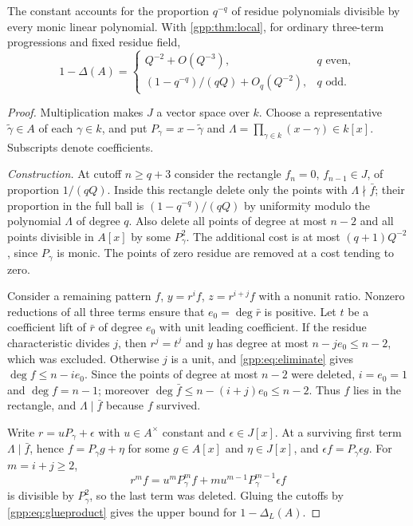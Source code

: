 The constant accounts for the proportion $q^{-q}$ of residue polynomials divisible by
every monic linear polynomial. With \cref{gpp:thm:local}, for ordinary three-term
progressions and fixed residue field,
\[
 1-\Delta(A)=\begin{cases}Q^{-2}+O(Q^{-3}),&q\text{ even},\\
 (1-q^{-q})/(qQ)+O_q(Q^{-2}),&q\text{ odd}.\end{cases}
\]

\begin{proof}
Multiplication makes $J$ a vector space over $k$. Choose a representative
$\tilde\gamma\in A$ of each $\gamma\in k$, and put $P_\gamma=x-\tilde\gamma$ and
$\Lambda=\prod_{\gamma\in k}(x-\gamma)\in k[x]$. Subscripts denote coefficients.

\emph{Construction.} At cutoff $n\ge q+3$ consider the rectangle $f_n=0$, $f_{n-1}\in J$,
of proportion $1/(qQ)$. Inside this rectangle delete only the points with
$\Lambda\nmid\bar f$; their proportion in the full ball is $(1-q^{-q})/(qQ)$ by
uniformity modulo the polynomial $\Lambda$ of degree $q$. Also delete all points of
degree at most $n-2$ and all points divisible in $A[x]$ by some $P_\gamma^2$. The
additional cost is at most $(q+1)Q^{-2}$, since $P_\gamma$ is monic. The points of zero
residue are removed at a cost tending to zero.

Consider a remaining pattern $f$, $y=r^if$, $z=r^{i+j}f$ with a nonunit ratio. Nonzero
reductions of all three terms ensure that $e_0=\deg\bar r$ is positive. Let $t$ be a
coefficient lift of $\bar r$ of degree $e_0$ with unit leading coefficient. If the
residue characteristic divides $j$, then $r^j=t^j$ and $y$ has degree at most
$n-je_0\le n-2$, which was excluded. Otherwise $j$ is a unit, and
\eqref{gpp:eq:eliminate} gives $\deg f\le n-ie_0$. Since the points of degree at most
$n-2$ were deleted, $i=e_0=1$ and $\deg f=n-1$; moreover
$\deg\bar f\le n-(i+j)e_0\le n-2$. Thus $f$ lies in the rectangle, and
$\Lambda\mid\bar f$ because $f$ survived.

Write $r=uP_\gamma+\epsilon$ with $u\in A^\times$ constant and $\epsilon\in J[x]$. At a
surviving first term $\Lambda\mid\bar f$, hence $f=P_\gamma g+\eta$ for some $g\in A[x]$
and $\eta\in J[x]$, and $\epsilon f=P_\gamma\epsilon g$. For $m=i+j\ge2$,
\[
 r^mf=u^mP_\gamma^mf+mu^{m-1}P_\gamma^{m-1}\epsilon f
\]
is divisible by $P_\gamma^2$, so the last term was deleted. Gluing the cutoffs by
\eqref{gpp:eq:glueproduct} gives the upper bound for $1-\Delta_L(A)$.


\end{proof}
